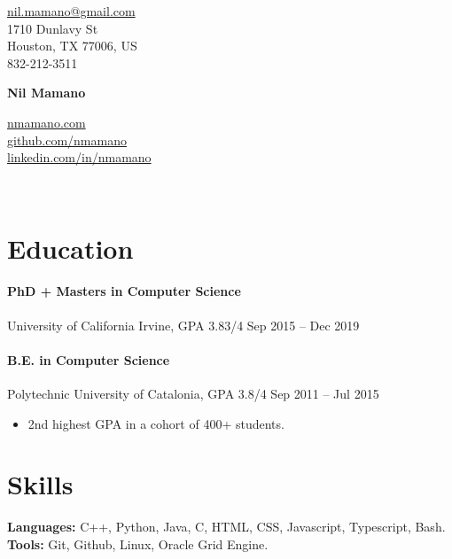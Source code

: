 \documentclass[letterpaper,10pt,oneside]{article}
\begin{document}
{\raggedleft

\begin{minipage}[c]{0.28\textwidth}
	\begin{flushleft}
	\href{mailto:nil.mamano@gmail.com}{nil.mamano@gmail.com}\\
	1710 Dunlavy St\\
	Houston, TX 77006, US\\
	832-212-3511
	\end{flushleft}
\end{minipage}\hfill
\begin{minipage}[c]{0.3\textwidth}
	\begin{center}
		\Huge{\textbf{Nil Mamano}}
	\end{center}
\end{minipage}\hfill
\begin{minipage}[c]{0.3\textwidth}
	\begin{flushright}
	\href{http://www.nmamano.com}{nmamano.com} \\
	\href{http://www.github.com/nmamano}{github.com/nmamano} \\
	\href{http://www.linkedin.com/in/nmamano}{linkedin.com/in/nmamano}
	\end{flushright}
\end{minipage}\\
\vspace{5px}
\hrulefill
}

\vspace{-2px}
\section*{Education}
\paragraph*{PhD + Masters in Computer Science} University of California Irvine, GPA 3.83/4 \hfill Sep 2015 -- Dec 2019
\paragraph*{B.E. in Computer Science} Polytechnic University of Catalonia, GPA 3.8/4 \hfill Sep 2011 -- Jul 2015
\vspace*{-1px}
\begin{itemize}[leftmargin=15px]
	\item 2nd highest GPA in a cohort of 400+ students.
\end{itemize}

\section*{Skills}
\textbf{Languages:} C++, Python, Java, C, HTML, CSS, Javascript, Typescript, Bash.~
\textbf{Tools:} Git, Github, Linux, Oracle Grid Engine.
\end{document}
